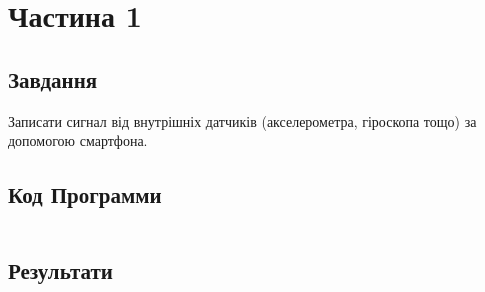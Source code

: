 \section{Частина 1}
\label{sec:task1}

\subsection{Завдання}
\label{subsec:task1_task}

Записати сигнал від внутрішніх датчиків
(акселерометра, гіроскопа тощо) за допомогою смартфона.

\subsection{Код Программи}
\label{subsec:task1_code}
\inputminted{python}{../src/task1.py}

\subsection{Результати}
\label{subsec:task1_results}
